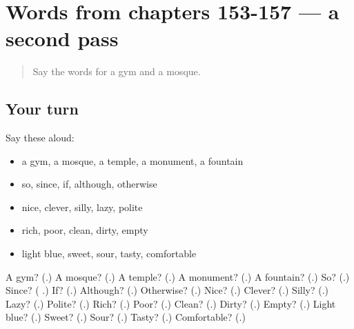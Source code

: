 \section[(dialogue)]{Words from chapters 153-157 — a second pass}

\label{lesson:RU-R157-second-pass-words-from-chapters-153-157}



\begin{quote}
Say the words for a gym and a mosque.
\end{quote}

\subsection*{Your turn}
Say these aloud:

\begin{itemize}
\raggedright
  \item a gym, a mosque, a temple, a monument, a fountain
  \item so, since, if, although, otherwise
  \item nice, clever, silly, lazy, polite
  \item rich, poor, clean, dirty, empty
  \item light blue, sweet, sour, tasty, comfortable
\end{itemize}

\begin{tcolorbox}[breakable,colback=teal!4,colframe=teal!35!black,title={Before you move on}]
A gym? (\textbf{}.) A mosque? (\textbf{}.) A temple? (\textbf{}.) A monument? (\textbf{}.) A fountain? (\textbf{}.) So? (\textbf{}.) Since? (\textbf{ }.) If? (\textbf{}.) Although? (\textbf{}.) Otherwise? (\textbf{}.) Nice? (\textbf{}.) Clever? (\textbf{}.) Silly? (\textbf{}.) Lazy? (\textbf{}.) Polite? (\textbf{}.) Rich? (\textbf{}.) Poor? (\textbf{}.) Clean? (\textbf{}.) Dirty? (\textbf{}.) Empty? (\textbf{}.) Light blue? (\textbf{}.) Sweet? (\textbf{}.) Sour? (\textbf{}.) Tasty? (\textbf{}.) Comfortable? (\textbf{}.)
\end{tcolorbox}

